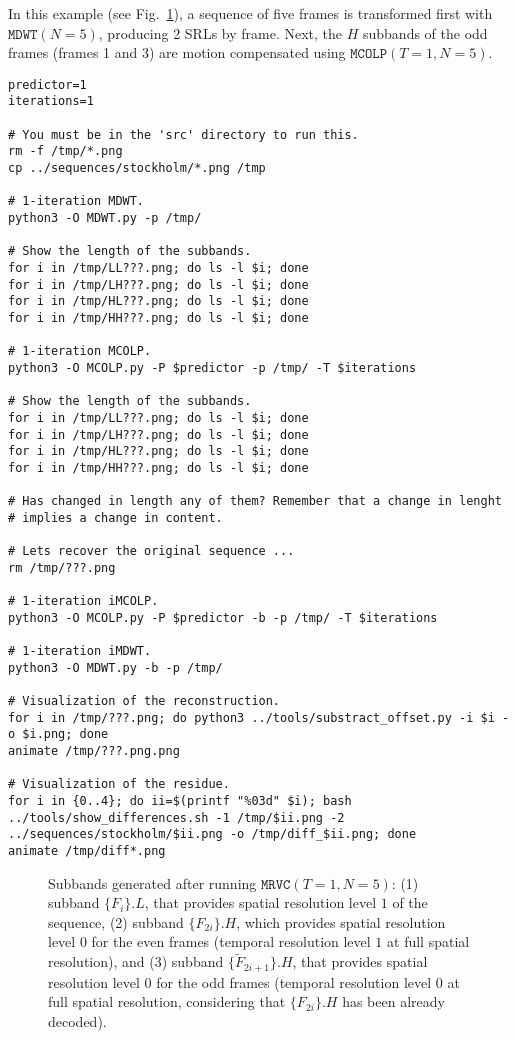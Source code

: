In this example (see Fig.~\ref{fig:1xMRVC1}), a sequence of five
frames is transformed first with $\mathtt{MDWT}(N=5)$, producing 2
SRLs by frame. Next, the $H$ subbands of the odd frames (frames 1 and
3) are motion compensated using $\mathtt{MCOLP}(T=1, N=5)$.

\begin{verbatim}
predictor=1
iterations=1

# You must be in the 'src' directory to run this.
rm -f /tmp/*.png
cp ../sequences/stockholm/*.png /tmp

# 1-iteration MDWT.
python3 -O MDWT.py -p /tmp/

# Show the length of the subbands.
for i in /tmp/LL???.png; do ls -l $i; done
for i in /tmp/LH???.png; do ls -l $i; done
for i in /tmp/HL???.png; do ls -l $i; done
for i in /tmp/HH???.png; do ls -l $i; done

# 1-iteration MCOLP.
python3 -O MCOLP.py -P $predictor -p /tmp/ -T $iterations

# Show the length of the subbands.
for i in /tmp/LL???.png; do ls -l $i; done
for i in /tmp/LH???.png; do ls -l $i; done
for i in /tmp/HL???.png; do ls -l $i; done
for i in /tmp/HH???.png; do ls -l $i; done

# Has changed in length any of them? Remember that a change in lenght
# implies a change in content.

# Lets recover the original sequence ...
rm /tmp/???.png

# 1-iteration iMCOLP.
python3 -O MCOLP.py -P $predictor -b -p /tmp/ -T $iterations

# 1-iteration iMDWT.
python3 -O MDWT.py -b -p /tmp/

# Visualization of the reconstruction.
for i in /tmp/???.png; do python3 ../tools/substract_offset.py -i $i -o $i.png; done
animate /tmp/???.png.png

# Visualization of the residue.
for i in {0..4}; do ii=$(printf "%03d" $i); bash ../tools/show_differences.sh -1 /tmp/$ii.png -2 ../sequences/stockholm/$ii.png -o /tmp/diff_$ii.png; done
animate /tmp/diff*.png
\end{verbatim}

\begin{figure}
  \centering
  \caption{Subbands generated after running $\mathtt{MRVC}(T=1, N=5)$:
    (1) subband $\{F_i\}.L$, that provides spatial resolution level
    $1$ of the sequence, (2) subband $\{F_{2i}\}.H$, which provides
    spatial resolution level $0$ for the even frames (temporal
    resolution level $1$ at full spatial resolution), and (3) subband
    $\{{\tilde F}_{2i+1}\}.H$, that provides spatial resolution level
    $0$ for the odd frames (temporal resolution level $0$ at full
    spatial resolution, considering that $\{F_{2i}\}.H$ has been
    already decoded).}
  \label{fig:1xMRVC1}
\end{figure}

